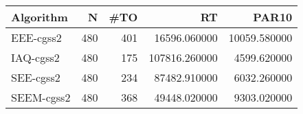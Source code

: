 \begin{tabular}{lrrrr}
\toprule
Algorithm & N & #TO & RT & PAR10 \\
\midrule
EEE-cgss2 & 480 & 401 & 16596.060000 & 10059.580000 \\
IAQ-cgss2 & 480 & 175 & 107816.260000 & 4599.620000 \\
SEE-cgss2 & 480 & 234 & 87482.910000 & 6032.260000 \\
SEEM-cgss2 & 480 & 368 & 49448.020000 & 9303.020000 \\
\bottomrule
\end{tabular}
